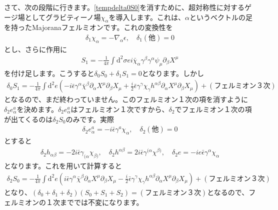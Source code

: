 \documentclass[report,paper=a4, fontsize=12pt, line_length=16cm, number_of_lines=34,dvipdfmx]{jlreq}
\numberwithin{equation}{chapter}
\numberwithin{equation}{section}
\newcommand{\del}{\partial}
\newcommand{\di}{\mathrm{d}}
\newcommand{\chib}{\bar{\chi}}
\newcommand{\epsilonb}{\bar{\epsilon}}
\begin{document}
さて、次の段階に行きます。\eqref{tempdelta0S0}を消すために、超対称性に対するゲージ場としてグラビティーノ場$\chi_{\alpha}$を導入します。これは、$\alpha$というベクトルの足を持ったMajoranaフェルミオンです。これの変換性を
\begin{align}
  \delta_{1}\chi_{\alpha}=-\nabla_{\alpha}\epsilon,\quad \delta_{1}(\text{他})=0
\end{align}
とし、さらに作用に
\begin{align}
  S_1=-\frac{1}{4\pi}\int \di^2 \sigma e i
  \chib_{\alpha}\gamma^{\beta}\gamma^{\alpha}\psi_{\mu}\del_{\beta}X^{\mu}
\end{align}
を付け足します。こうすると$\delta_{0}S_0+\delta_{1}S_1=0$となります。しかし
\begin{align}
  \delta_{0}S_1=-\frac{1}{4\pi}\int \di^2 e\left(-i\epsilonb \gamma^{\alpha}\chib^{\beta}\del_{\alpha}X^{\mu}\del_{\beta}X_{\mu}+\frac{i}{2}\epsilonb \gamma^{\gamma}\chi_{\gamma}h^{\alpha\beta}\del_{\alpha}X^{\mu}\del_{\beta}X_{\mu}  \right)+(\text{フェルミオン３次})
\end{align}
となるので、まだ終わっていません。このフェルミオン１次の項を消すように$\delta_{2}e^{a}_{\alpha}$を決めます。$\delta_{2}e^{a}_{\alpha}$はフェルミオン１次ですから、$\delta_2$でフェルミオン１次の項が出てくるのは$\delta_2 S_0$のみです。実際
\begin{align}
  \delta_2 e^{a}_{\alpha}=-i\epsilonb \gamma^{a}\chi_{\alpha},\quad
  \delta_2 (\text{他})=0
\end{align}
とすると
\begin{align}
  \delta_2 h_{\alpha\beta}=-2i\epsilonb \gamma_{(\alpha}\chi_{\beta)},\quad
  \delta_2 h^{\alpha\beta}=2i\epsilonb \gamma^{(\alpha}\chi^{\beta)},\quad
  \delta_2 e = -ie \epsilonb \gamma^{\alpha}\chi_{\alpha}
\end{align}
となります。これを用いて計算すると
\begin{align}
  \delta_2 S_0=-\frac{1}{4\pi}\int \di^2 e\left(i\epsilonb \gamma^{\alpha}\chib^{\beta}\del_{\alpha}X^{\mu}\del_{\beta}X_{\mu}-\frac{i}{2}\epsilonb \gamma^{\gamma}\chi_{\gamma}h^{\alpha\beta}\del_{\alpha}X^{\mu}\del_{\beta}X_{\mu}  \right)+(\text{フェルミオン３次})
\end{align}
となり、$(\delta_0+\delta_1+\delta_2)(S_0+S_1+S_2)=(\text{フェルミオン３次})$となるので、フェルミオンの１次まででは不変になります。
\end{document}
